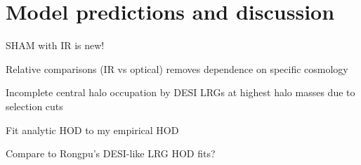 \documentclass[twocolumn,apj,iop,tighten]{emulateapj2}
\begin{document}
%
%

\section{Model predictions and discussion}\label{sec:predictions}

SHAM with IR is new!

Relative comparisons (IR vs optical) removes dependence on specific cosmology

Incomplete central halo occupation by DESI LRGs at highest halo masses due to selection cuts

Fit analytic HOD to my empirical HOD

Compare to Rongpu's DESI-like LRG HOD fits?
\end{document}
